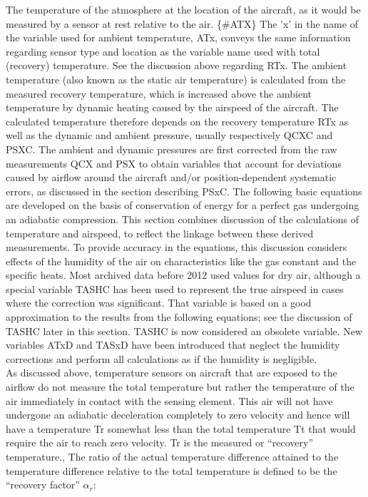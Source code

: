 \documentclass[
  english,
]{book}
\begin{document}
The temperature of the atmosphere at the location of the aircraft, as it would be measured by a sensor at rest relative to the air. \{\#ATX\}
The 'x' in the name of the variable used for ambient temperature, ATx, conveys the same information regarding sensor type and location as the variable name used with total (recovery) temperature. See the discussion above regarding RTx. The ambient temperature (also known as the static air temperature) is calculated from the measured recovery temperature, which is increased above the ambient temperature by dynamic heating caused by the airspeed of the aircraft. The calculated temperature therefore depends on the recovery temperature RTx as well as the dynamic and ambient pressure, usually respectively QCXC and PSXC. The ambient and dynamic pressures are first corrected from the raw measurements QCX and PSX to obtain variables that account for deviations caused by airflow around the aircraft and/or position-dependent systematic errors, as discussed in the section describing PSxC. The following basic equations are developed on the basis of conservation of energy for a perfect gas undergoing an adiabatic compression.
This section combines discussion of the calculations of temperature and airspeed, to reflect the linkage between these derived measurements. To provide accuracy in the equations, this discussion considers effects of the humidity of the air on characteristics like the gas constant and the specific heats. Most archived data before 2012 used values for dry air, although a special variable TASHC has been used to represent the true airspeed in cases where the correction was significant. That variable is based on a good approximation to the results from the following equations; see the discussion of TASHC later in this section. TASHC is now considered an obsolete variable. New variables ATxD and TASxD have been introduced that neglect the humidity corrections and perform all calculations as if the humidity is negligible.
\\
As discussed above, temperature sensors on aircraft that are exposed to the airflow do not measure the total temperature but rather the temperature of the air immediately in contact with the sensing element. This air will not have undergone an adiabatic deceleration completely to zero velocity and hence will have a temperature {Tr} somewhat less than the total temperature {Tt} that would require the air to reach zero velocity. {Tr} is the measured or ``recovery'' temperature., The ratio of the actual temperature difference attained to the temperature difference relative to the total temperature is defined to be the ``recovery factor'' \(\alpha_r\):
\end{document}
